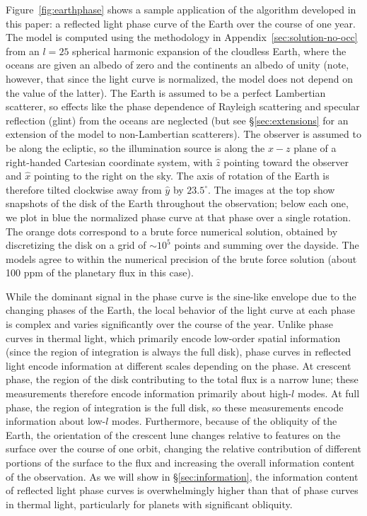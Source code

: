 \documentclass[modern]{aastex62}
\begin{document}
Figure~\ref{fig:earthphase} shows a sample application of the algorithm
developed in this paper: a reflected light phase curve of the
Earth over the course of one year. The model is computed using the
methodology in Appendix~\ref{sec:solution-no-occ} from an $l=25$
spherical harmonic expansion of the cloudless Earth, where the oceans
are given an albedo of zero and the continents an albedo of unity
(note, however, that since the light curve is normalized, the model does
not depend on the value of the latter).
The Earth is assumed to be a perfect Lambertian scatterer,
so effects like the phase dependence of Rayleigh scattering and
specular reflection (glint) from the oceans are neglected
(but see \S\ref{sec:extensions} for an extension of the model to
non-Lambertian scatterers).
The observer is assumed to be along
the ecliptic, so the illumination source is along the $x-z$ plane of a
right-handed Cartesian coordinate system, with $\hat{z}$ pointing toward the
observer and $\hat{x}$ pointing to the right on the sky. The axis of rotation
of the Earth is therefore tilted clockwise away from
$\hat{y}$ by $23.5^\circ$.
The images at the top show snapshots of the disk of the Earth throughout
the observation; below each one, we plot in blue the normalized phase curve
at that phase over a single rotation. The orange dots correspond to a
brute force numerical solution, obtained by discretizing the disk
on a grid of ${\sim}10^5$ points and summing over the dayside.
The models agree to within the
numerical precision of the brute force solution (about 100 ppm of the
planetary flux in this case).

While the dominant signal in the phase curve is the sine-like envelope
due to the changing phases of the Earth, the local behavior of the light
curve at each phase is complex and varies significantly over the course
of the year. Unlike phase curves in thermal light, which primarily encode
low-order spatial information (since the region of integration is always
the full disk), phase curves in reflected light encode information at
different scales depending on the phase. At crescent phase, the region of the
disk contributing to the total flux is a narrow lune; these measurements
therefore encode information primarily about high-$l$ modes. At full
phase, the region of integration is the full disk, so these measurements
encode information about low-$l$ modes. Furthermore, because of the obliquity
of the Earth,
the orientation of the crescent lune changes relative to features on the
surface over the course of one orbit, changing the relative contribution of
different portions of the surface to the flux and increasing the
overall information content of the observation.
As we will show in \S\ref{sec:information}, the information content of
reflected light phase curves is overwhelmingly higher than that of
phase curves in thermal light, particularly for planets with significant
obliquity.
\end{document}
